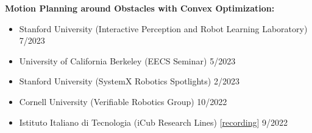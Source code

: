 \documentclass[11pt,a4paper,sans]{moderncv}
\begin{document}
\vspace{5pt}

\textbf{Motion Planning around Obstacles with Convex Optimization:}

\vspace{5pt}

\begin{itemize}

\item Stanford University (Interactive Perception and Robot Learning Laboratory) \hfill 7/2023
\item University of California Berkeley (EECS Seminar) \hfill 5/2023
\item Stanford University (SystemX Robotics Spotlights) \hfill 2/2023
\item Cornell University (Verifiable Robotics Group) \hfill 10/2022
\item  Istituto Italiano di Tecnologia (iCub Research Lines) [\href{https://www.youtube.com/watch?v=FoqAAgqgn-o}{\color{orange}recording}] \hfill 9/2022

\end{itemize}

\vspace{5pt}
\end{document}
